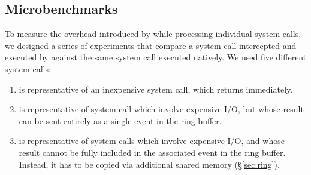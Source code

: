 \subsection{Microbenchmarks}
\label{sec:microbenchmarks}

To measure the overhead introduced by \nx while processing individual
system calls, we designed a series of experiments that compare a
system call intercepted and executed by \nx against the same system
call executed natively. We used five different system calls:

\begin{enumerate}


\item {} is representative of an inexpensive system call,
  which returns immediately.


\item{} is representative of system call which involve
  expensive I/O, but whose result can be sent entirely as a single event in the
  ring buffer.


\item {} is representative of system calls which
  involve expensive I/O, and whose result cannot be fully included in the
  associated event in the ring buffer.  Instead, it has to be copied via
  additional shared memory (\S\ref{sec:ring}).



\end{enumerate}
